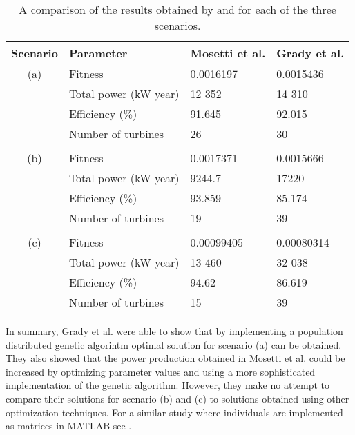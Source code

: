 \begin{table}[h!]
\begin{center}
\caption{A comparison of the results  obtained by \cite{Mosetti} and \cite{Grady} for each of the three scenarios.}
\label{Results Grady et al.}
\begin{tabular}{c|l|l|l}
Scenario & Parameter                    & Mosetti et al.  & Grady et al. \\ 
\hline 
(a)          & Fitness                        & 0.0016197     & 0.0015436 \\ 
              & Total power (kW year) & 12 352           & 14 310 \\ 
              & Efficiency (\%)            & 91.645            & 92.015 \\ 
              & Number of turbines     & 26                    & 30  \\ 
&&&\\
(b)         & Fitness                        & 0.0017371      & 0.0015666 \\ 
              & Total power (kW year) & 9244.7           & 17220 \\ 
              & Efficiency (\%)            & 93.859           & 85.174 \\ 
              & Number of turbines     & 19                   & 39 \\ 
&&&\\
(c)         & Fitness                        & 0.00099405   & 0.00080314 \\ 
              & Total power (kW year) & 13 460          & 32 038 \\ 
              & Efficiency (\%)            & 94.62            & 86.619 \\ 
              & Number of turbines     & 15                  & 39 \\  
\end{tabular} 
\end{center}
\end{table}


\noindent In summary, Grady et al. were able to show that by implementing a population distributed genetic algorihtm optimal solution for scenario (a) can be obtained. They also showed that the power production obtained in Mosetti et al. could be increased by optimizing parameter values and using a more sophisticated implementation of the genetic algorithm. However, they make no attempt to compare their solutions for scenario (b) and (c) to solutions obtained using other optimization techniques. For a similar study where individuals are implemented as matrices in MATLAB see \cite{Emami}.\\


